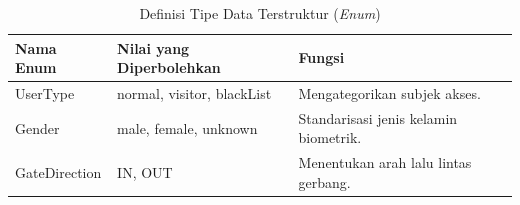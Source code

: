 \begin{table}[t]
    \centering
    \caption{Definisi Tipe Data Terstruktur (\textit{Enum})}
    \label{tab:definisi_enum}
    \begin{tabular}{|l|l|p{7cm}|}
        \hline
        \textbf{Nama Enum} & \textbf{Nilai yang Diperbolehkan} & \textbf{Fungsi} \\
        \hline
        UserType & normal, visitor, blackList & Mengategorikan subjek akses. \\
        \hline
        Gender & male, female, unknown & Standarisasi jenis kelamin biometrik. \\
        \hline
        GateDirection & IN, OUT & Menentukan arah lalu lintas gerbang. \\
        \hline
    \end{tabular}
\end{table}
